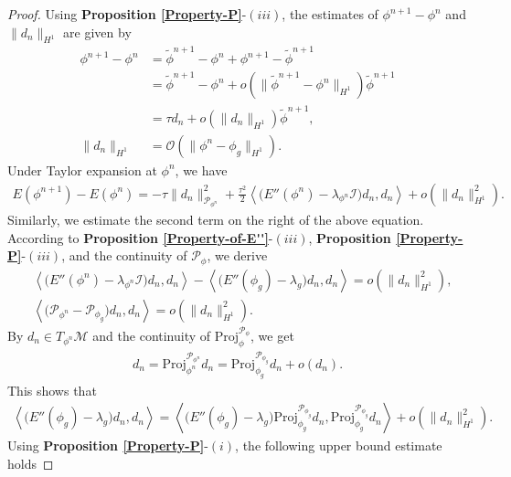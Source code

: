 \documentclass[preprint,3p]{elsarticle}
\begin{document}
\begin{proof}
	Using {\bf Proposition \ref{Property-P}}-$(iii)$, the estimates of $\phi^{n+1}-\phi^n$ and $\|d_n\|_{H^1}$ are given by
	\begin{align}
		\nonumber\phi^{n+1}-\phi^n&=\widetilde{\phi}^{n+1}-\phi^n+\phi^{n+1}-\widetilde{\phi}^{n+1}\\
		\nonumber&=\widetilde{\phi}^{n+1}-\phi^n+o\left(\big\|\widetilde{\phi}^{n+1}-\phi^n\big\|_{H^1}\right)\widetilde{\phi}^{n+1}\\
		&=\tau d_n+o\left(\|d_n\|_{H^1}\right)\widetilde{\phi}^{n+1}\label{C_t1},\\
		\|d_n\|_{H^1}&=\mathcal{O}\left(\|\phi^n-\phi_g\|_{H^1}\right)\label{C_t2}.
	\end{align} 
	Under Taylor expansion at $\phi^n$, we have
	\begin{align*}
		E(\phi^{n+1})-E(\phi^n)=-\tau\|d_n\|^2_{\mathcal{P}_{\phi^n}}+\frac{\tau^2}{2}\left\langle \big(E''(\phi^{n})-\lambda_{\phi^n}\mathcal{I}\big)d_n,d_n\right\rangle+o\left(\|d_n\|^2_{H^1}\right).
	\end{align*}
	Similarly, we estimate the second term on the right of the above equation.
	According to {\bf Proposition \ref{Property-of-E''}}-$(iii)$, {\bf Proposition \ref{Property-P}}-$(iii)$, and the continuity of $\mathcal{P}_{\phi}$, we derive
	\begin{align*}
		&\left\langle \big(E''(\phi^n)-\lambda_{\phi^n}\mathcal{I}\big)d_n,d_n\right\rangle-\left\langle \big(E''(\phi_g)-\lambda_g\big)d_n,d_n\right\rangle=o\left(\|d_n\|^2_{H^1}\right),\\
		&\left\langle\big(\mathcal{P}_{\phi^n}-\mathcal{P}_{\phi_g}\big)d_n,d_n\right\rangle=o\left(\|d_n\|^2_{H^1}\right).
	\end{align*}
	By $d_n\in T_{\phi^n}\mathcal{M}$ and the continuity of $\text{Proj}_{\phi}^{\mathcal{P}_{\phi}}$, we get
	\begin{align*}
		d_n=\text{Proj}^{\mathcal{P}_{\phi^n}}_{\phi^n}d_n=\text{Proj}^{\mathcal{P}_{\phi_g}}_{\phi_g}d_n+o(d_n).
	\end{align*}
	This shows that 
	\begin{align*}
		\left\langle \big(E''(\phi_g)-\lambda_g\big)d_n,d_n\right\rangle=\left\langle \big(E''(\phi_g)-\lambda_g\big)\text{Proj}^{\mathcal{P}_{\phi_g}}_{\phi_g}d_n,\text{Proj}^{\mathcal{P}_{\phi_g}}_{\phi_g}d_n\right\rangle+o\left(\|d_n\|^2_{H^1}\right).
	\end{align*}
	Using {\bf Proposition \ref{Property-P}}-$(i)$, the following upper bound estimate holds

\end{proof}
\end{document}
